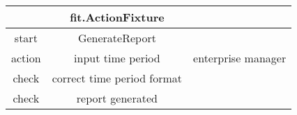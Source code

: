 
\begin{centering}
\begin{table}
\begin{tabular}{|c|c|c|}

\hline \multicolumn{1}{|c}{} & \multicolumn{1}{c}{fit.ActionFixture} & \multicolumn{1}{c|}{} \\ \hline
\hline start & GenerateReport &  \\ 
\hline action & input time period & enterprise manager \\ 
\hline check & correct time period format &  \\ 
\hline check & report generated &  \\ 
\hline 
\end{tabular} 
\end{table}
\end{centering}